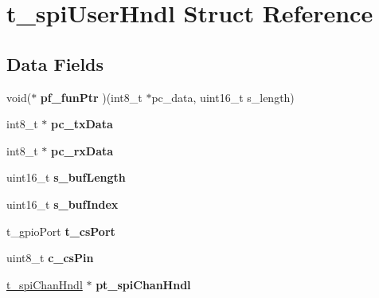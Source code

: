\hypertarget{structt__spi_user_hndl}{\section{t\-\_\-spi\-User\-Hndl Struct Reference}
\label{structt__spi_user_hndl}
}
\subsection*{Data Fields}
\begin{DoxyCompactItemize}
\item 
\hypertarget{structt__spi_user_hndl_a46281310a9d74c9f99b38a780ff03ee4}{void($\ast$ {\bfseries pf\-\_\-fun\-Ptr} )(int8\-\_\-t $\ast$pc\-\_\-data, uint16\-\_\-t s\-\_\-length)}\label{structt__spi_user_hndl_a46281310a9d74c9f99b38a780ff03ee4}

\item 
\hypertarget{structt__spi_user_hndl_a0053cb84281e32d32f7979eccbf0d9e3}{int8\-\_\-t $\ast$ {\bfseries pc\-\_\-tx\-Data}}\label{structt__spi_user_hndl_a0053cb84281e32d32f7979eccbf0d9e3}

\item 
\hypertarget{structt__spi_user_hndl_afe2570c4be33989ddef366f82133df35}{int8\-\_\-t $\ast$ {\bfseries pc\-\_\-rx\-Data}}\label{structt__spi_user_hndl_afe2570c4be33989ddef366f82133df35}

\item 
\hypertarget{structt__spi_user_hndl_af98da11c71536646662e9cc69d020c30}{uint16\-\_\-t {\bfseries s\-\_\-buf\-Length}}\label{structt__spi_user_hndl_af98da11c71536646662e9cc69d020c30}

\item 
\hypertarget{structt__spi_user_hndl_a047ca5f6b87f39d833c25140f604e650}{uint16\-\_\-t {\bfseries s\-\_\-buf\-Index}}\label{structt__spi_user_hndl_a047ca5f6b87f39d833c25140f604e650}

\item 
\hypertarget{structt__spi_user_hndl_a3d87083c0b55835fba9ce5adede49eb5}{t\-\_\-gpio\-Port {\bfseries t\-\_\-cs\-Port}}\label{structt__spi_user_hndl_a3d87083c0b55835fba9ce5adede49eb5}

\item 
\hypertarget{structt__spi_user_hndl_a1e2115cc9d9a05b892c8eb3426441036}{uint8\-\_\-t {\bfseries c\-\_\-cs\-Pin}}\label{structt__spi_user_hndl_a1e2115cc9d9a05b892c8eb3426441036}

\item 
\hypertarget{structt__spi_user_hndl_a29972ab1092889b0908d3b6b57bcc1d2}{\hyperlink{structt__spi_chan_hndl}{t\-\_\-spi\-Chan\-Hndl} $\ast$ {\bfseries pt\-\_\-spi\-Chan\-Hndl}}\label{structt__spi_user_hndl_a29972ab1092889b0908d3b6b57bcc1d2}


\end{DoxyCompactItemize}
